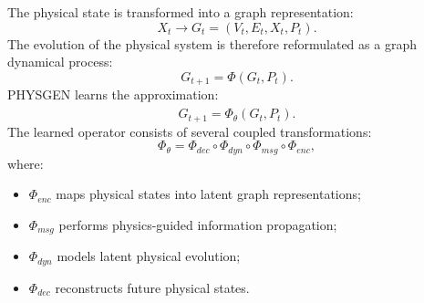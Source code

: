 The physical state is transformed into a graph representation: \begin{equation} X_t \rightarrow G_t=(V_t,E_t,X_t,P_t). \end{equation} The evolution of the physical system is therefore reformulated as a graph dynamical process: \begin{equation} G_{t+1} = \Phi(G_t,P_t). \end{equation} PHYSGEN learns the approximation: \begin{equation} \hat{G}_{t+1} = \Phi_{\theta}(G_t,P_t). \end{equation} The learned operator consists of several coupled transformations: \begin{equation} \Phi_{\theta} = \Phi_{dec} \circ \Phi_{dyn} \circ \Phi_{msg} \circ \Phi_{enc}, \end{equation} where: \begin{itemize} \item $\Phi_{enc}$ maps physical states into latent graph representations; \item $\Phi_{msg}$ performs physics-guided information propagation; \item $\Phi_{dyn}$ models latent physical evolution; \item $\Phi_{dec}$ reconstructs future physical states. \end{itemize} %